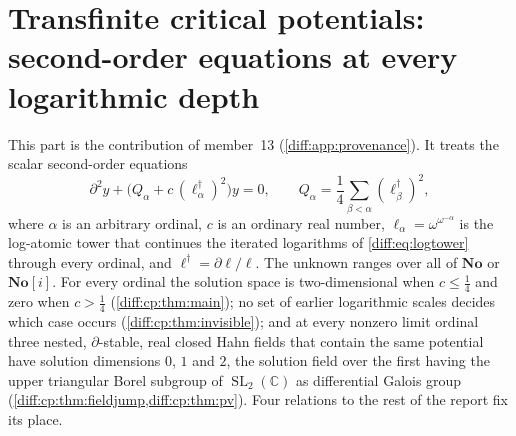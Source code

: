 \documentclass[11pt,letterpaper]{article}
\numberwithin{equation}{section}
\theoremstyle{definition}
\theoremstyle{remark}
\newcommand{\No}{\mathbf{No}}
\newcommand{\SC}{\mathbf{No}[i]}
\newcommand{\C}{\mathbb C}
\newcommand{\der}{\partial}
\newcommand{\SL}{\operatorname{SL}}
\begin{document}
\part{Transfinite critical potentials: second-order equations at every logarithmic depth}
\label{diff:cp:part}

This part is the contribution of member~13 (\cref{diff:app:provenance}). It
treats the scalar second-order equations
\[
 \der^{2}y+\bigl(Q_{\alpha}+c\,(\ell_{\alpha}^{\dagger})^{2}\bigr)y=0,
 \qquad
 Q_{\alpha}=\frac14\sum_{\beta<\alpha}(\ell_{\beta}^{\dagger})^{2},
\]
where $\alpha$ is an arbitrary ordinal, $c$ is an ordinary real number,
$\ell_{\alpha}=\omega^{\omega^{-\alpha}}$ is the log-atomic tower that continues
the iterated logarithms of \cref{diff:eq:logtower} through every ordinal, and
$\ell^{\dagger}=\der\ell/\ell$. The unknown ranges over all of $\No$ or $\SC$.
For every ordinal the solution space is two-dimensional when $c\leq\frac14$ and
zero when $c>\frac14$ (\cref{diff:cp:thm:main}); no set of earlier logarithmic
scales decides which case occurs (\cref{diff:cp:thm:invisible}); and at every
nonzero limit ordinal three nested, $\der$-stable, real closed Hahn fields that
contain the same potential have solution dimensions $0$, $1$ and $2$, the
solution field over the first having the upper triangular Borel subgroup of
$\SL_{2}(\C)$ as differential Galois group
(\cref{diff:cp:thm:fieldjump,diff:cp:thm:pv}). Four relations to the rest of the
report fix its place.
\end{document}

